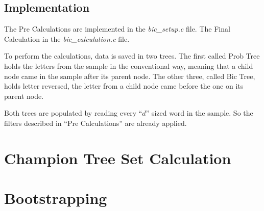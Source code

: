 \documentclass[brazil,11pt]{article}
\begin{document}
\subsection{Implementation}

The Pre Calculations are implemented in the \emph{bic\_setup.c} file. The Final Calculation in the \emph{bic\_calculation.c} file.

To perform the calculations, data is saved in two trees. The first called Prob Tree holds the letters from the sample in the conventional way, meaning that a child node came in the sample after its parent node. The other three, called Bic Tree, holds letter reversed, the letter from a child node came before the one on its parent node.

Both trees are populated by reading every ``$d$'' sized word in the sample. So the filters described in ``Pre Calculations'' are already applied.

\section{Champion Tree Set Calculation}

\section{Bootstrapping}
\end{document}
